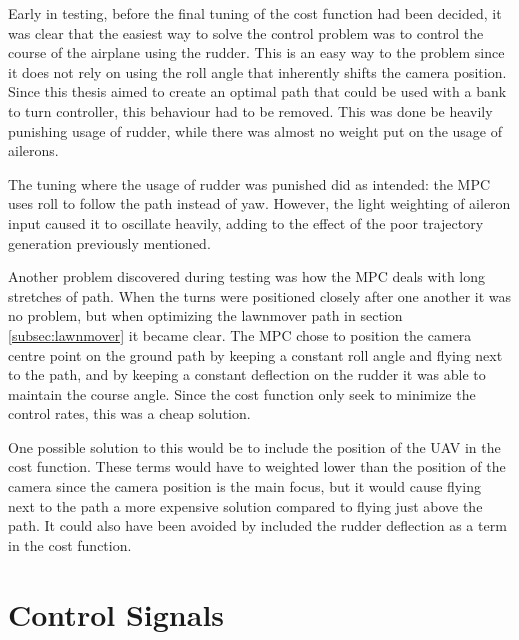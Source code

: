 Early in testing, before the final tuning of the cost function had been decided, it was clear that the easiest way to solve the control problem was to control the course of the airplane using the rudder. This is an easy way to the problem since it does not rely on using the roll angle that inherently shifts the camera position. Since this thesis aimed to create an optimal path that could be used with a bank to turn controller, this behaviour had to be removed. This was done be heavily punishing usage of rudder, while there was almost no weight put on the usage of ailerons.

The tuning where the usage of rudder was punished did as intended: the MPC uses roll to follow the path instead of yaw. However, the light weighting of aileron input caused it to oscillate heavily, adding to the effect of the poor trajectory generation previously mentioned.

Another problem discovered during testing was how the MPC deals with long stretches of path. When the turns were positioned closely after one another it was no problem, but when optimizing the lawnmover path in section \ref{subsec:lawnmover} it became clear. The MPC chose to position the camera centre point on the ground path by keeping a constant roll angle and flying next to the path, and by keeping a constant deflection on the rudder it was able to maintain the course angle. Since the cost function only seek to minimize the control rates, this was a cheap solution.

One possible solution to this would be to include the position of the UAV in the cost function. These terms would have to weighted lower than the position of the camera since the camera position is the main focus, but it would cause flying next to the path a more expensive solution compared to flying just above the path. It could also have been avoided by included the rudder deflection as a term in the cost function.


\section{Control Signals}


